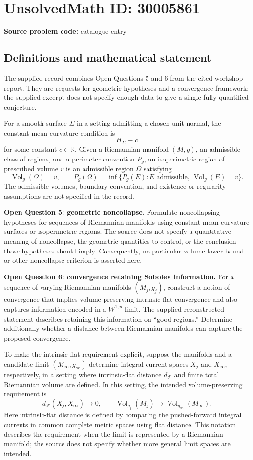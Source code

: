 \documentclass[11pt]{article}
\newcommand{\R}{\mathbb{R}}
\begin{document}
\section*{UnsolvedMath ID: 30005861}
\textbf{Source problem code:} catalogue entry
\subsection{Definitions and mathematical statement}
The supplied record combines Open Questions 5 and 6 from the cited workshop report. They are requests for geometric hypotheses and a convergence framework; the supplied excerpt does not specify enough data to give a single fully quantified conjecture.

For a smooth surface \(\Sigma\) in a setting admitting a chosen unit normal, the constant-mean-curvature condition is
\[
H_\Sigma\equiv c
\]
for some constant \(c\in\R\). Given a Riemannian manifold \((M,g)\), an admissible class of regions, and a perimeter convention \(P_g\), an isoperimetric region of prescribed volume \(v\) is an admissible region \(\Omega\) satisfying
\[
\operatorname{Vol}_g(\Omega)=v,
\qquad
P_g(\Omega)=\inf\{P_g(E): E\text{ admissible},\ \operatorname{Vol}_g(E)=v\}.
\]
The admissible volumes, boundary convention, and existence or regularity assumptions are not specified in the record.

\textbf{Open Question 5: geometric noncollapse.} Formulate noncollapsing hypotheses for sequences of Riemannian manifolds using constant-mean-curvature surfaces or isoperimetric regions. The source does not specify a quantitative meaning of noncollapse, the geometric quantities to control, or the conclusion those hypotheses should imply. Consequently, no particular volume lower bound or other noncollapse criterion is asserted here.

\textbf{Open Question 6: convergence retaining Sobolev information.} For a sequence of varying Riemannian manifolds \((M_j,g_j)\), construct a notion of convergence that implies volume-preserving intrinsic-flat convergence and also captures information encoded in a \(W^{1,p}\) limit. The supplied reconstructed statement describes retaining this information on ``good regions.'' Determine additionally whether a distance between Riemannian manifolds can capture the proposed convergence.

To make the intrinsic-flat requirement explicit, suppose the manifolds and a candidate limit \((M_\infty,g_\infty)\) determine integral current spaces \(X_j\) and \(X_\infty\), respectively, in a setting where intrinsic-flat distance \(d_{\mathcal F}\) and finite total Riemannian volume are defined. In this setting, the intended volume-preserving requirement is
\[
d_{\mathcal F}(X_j,X_\infty)\longrightarrow 0,
\qquad
\operatorname{Vol}_{g_j}(M_j)\longrightarrow
\operatorname{Vol}_{g_\infty}(M_\infty).
\]
Here intrinsic-flat distance is defined by comparing the pushed-forward integral currents in common complete metric spaces using flat distance. This notation describes the requirement when the limit is represented by a Riemannian manifold; the source does not specify whether more general limit spaces are intended.
\end{document}
